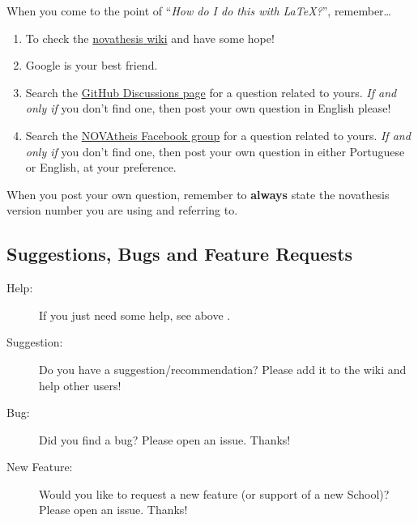 When you come to the point of “\emph{How do I do this with \LaTeX?}”, remember…

\begin{enumerate}
  \item To check the \href{https://github.com/joaomlourenco/novathesis/wiki}{\gls{novathesis} wiki} and have some hope!  \emojiSmile
  \item Google is your best friend.
  \item Search the \href{https://github.com/joaomlourenco/novathesis/discussions}{GitHub Discussions page} for a question related to yours.  \emph{If and only if} you don't find one, then post your own question in English please!
  \item Search the \href{https://www.facebook.com/groups/novathesis}{NOVAtheis Facebook group} for a question related to yours.  \emph{If and only if} you don't find one, then post your own question in either Portuguese or English, at your preference.
\end{enumerate}

When you post your own question, remember to \textbf{always} state the \gls{novathesis} version number you are using and referring to.

\begin{center}
\end{center}


\subsection{Suggestions, Bugs and Feature Requests} %
\label{sub:suggestions_bugs_and_feature_requests}

\begin{description}
  \item[Help:] If you just need some help, see above .
  \item[Suggestion:] \ntindex[Suggestions]{} Do you have a suggestion/recommendation? Please add it to the wiki and help other users!
  \item[Bug:] \ntindex[Bugs]{} Did you find a bug? Please open an issue. Thanks!
  \item[New Feature:]  Would you like to request a new feature (or support of a new School)? Please open an issue. Thanks!

\end{description}



